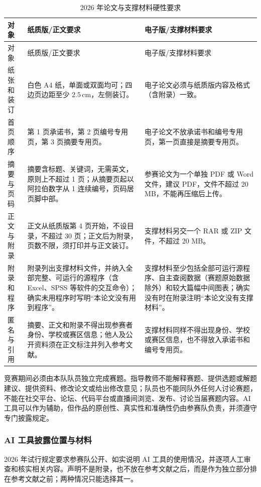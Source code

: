 \documentclass[UTF8,zihao=-4]{ctexart}
\begin{document}
\begin{longtable}{p{2.7cm}p{5.7cm}p{6.2cm}}
\caption{2026 年论文与支撑材料硬性要求}\label{tab:official-format-rules}\\
\toprule
对象 & 纸质版/正文要求 & 电子版/支撑材料要求\\
\midrule
\endfirsthead
\toprule
对象 & 纸质版/正文要求 & 电子版/支撑材料要求\\
\midrule
\endhead
纸张和装订 & 白色 A4 纸，单面或双面均可；四边页边距至少 $2.5\,\mathrm{cm}$，左侧装订。 & 电子论文必须与纸质版内容及格式（含附录）一致。\\
首页顺序 & 第 1 页承诺书，第 2 页编号专用页，第 3 页摘要专用页。 & 电子论文不放承诺书和编号专用页，第一页直接是摘要专用页。\\
摘要与页码 & 摘要含标题、关键词，无需英文，原则上不超过 1 页；从摘要页起以阿拉伯数字从 1 连续编号，页码居页脚中部。 & 参赛论文为一个单独 PDF 或 Word 文件，建议 PDF，文件不超过 20 MB，不能再压缩后上传。\\
正文与附录 & 正文从纸质版第 4 页开始，不设目录，不超过 30 页；正文后为附录，页数不限，须打印并与正文装订。 & 支撑材料另交一个 RAR 或 ZIP 文件，不超过 20 MB。\\
附录和程序 & 附录列出支撑材料文件，并纳入全部完整、可运行的源程序（含 Excel、SPSS 等软件的交互命令）；确实未用程序时写明“本论文没有用到程序”。 & 支撑材料至少包括全部可运行源程序、自主查阅数据（赛题原始数据除外）和较大篇幅中间图表；确实没有时在附录注明“本论文没有支撑材料”。\\
匿名与引用 & 摘要、正文和附录不得出现参赛者身份、学校或赛区信息；他人及公开资料须在正文标注并列入参考文献。 & 支撑材料同样不得出现身份、学校或赛区信息，也不得放入承诺书和编号专用页。\\
\bottomrule
\end{longtable}

竞赛期间必须由本队队员独立完成赛题。指导教师不能解释赛题、提供选题或解题建议、提供资料、修改论文或给出修改意见；队员也不能同队外任何人讨论赛题，不能在社交平台、论坛、代码平台或直播间浏览、发布、讨论当届赛题内容。AI 工具可以作为辅助，但作品的原创性、真实性和准确性仍由参赛队负责，并须遵守专门披露规定。

\subsubsection{AI 工具披露位置与材料}

2026 年试行规定要求参赛队公开、如实说明 AI 工具的使用情况，并逐项人工审查和核实相关内容。声明不是附录，也不放在参考文献之后，而是作为独立部分排在参考文献之前；两种情况只能选择其一。
\end{document}
